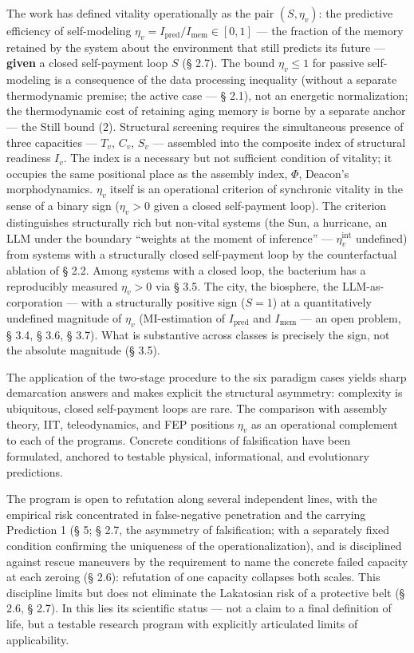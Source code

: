 \documentclass[pdflatex,sn-mathphys-ay]{sn-jnl}
\begin{document}
The work has defined vitality operationally as the pair \((S, \eta_v)\): the predictive efficiency of self-modeling \(\eta_v = I_{\text{pred}} / I_{\text{mem}} \in [0,1]\) --- the fraction of the memory retained by the system about the environment that still predicts its future --- \textbf{given} a closed self-payment loop \(S\) (§ 2.7). The bound \(\eta_v \le 1\) for passive self-modeling is a consequence of the data processing inequality (without a separate thermodynamic premise; the active case --- § 2.1), not an energetic normalization; the thermodynamic cost of retaining aging memory is borne by a separate anchor --- the Still bound (2). Structural screening requires the simultaneous presence of three capacities --- \(T_v\), \(C_v\), \(S_v\) --- assembled into the composite index of structural readiness \(I_v\). The index is a necessary but not sufficient condition of vitality; it occupies the same positional place as the assembly index, \(\Phi\), Deacon's morphodynamics. \(\eta_v\) itself is an operational criterion of synchronic vitality in the sense of a binary sign (\(\eta_v > 0\) given a closed self-payment loop). The criterion distinguishes structurally rich but non-vital systems (the Sun, a hurricane, an LLM under the boundary ``weights at the moment of inference'' --- \(\eta_v^{\text{int}}\) undefined) from systems with a structurally closed self-payment loop by the counterfactual ablation of § 2.2. Among systems with a closed loop, the bacterium has a reproducibly measured \(\eta_v > 0\) via § 3.5. The city, the biosphere, the LLM-as-corporation --- with a structurally positive sign (\(S = 1\)) at a quantitatively undefined magnitude of \(\eta_v\) (MI-estimation of \(I_{\text{pred}}\) and \(I_{\text{mem}}\) --- an open problem, § 3.4, § 3.6, § 3.7). What is substantive across classes is precisely the sign, not the absolute magnitude (§ 3.5).

The application of the two-stage procedure to the six paradigm cases yields sharp demarcation answers and makes explicit the structural asymmetry: complexity is ubiquitous, closed self-payment loops are rare. The comparison with assembly theory, IIT, teleodynamics, and FEP positions \(\eta_v\) as an operational complement to each of the programs. Concrete conditions of falsification have been formulated, anchored to testable physical, informational, and evolutionary predictions.

The program is open to refutation along several independent lines, with the empirical risk concentrated in false-negative penetration and the carrying Prediction 1 (§ 5; § 2.7, the asymmetry of falsification; with a separately fixed condition confirming the uniqueness of the operationalization), and is disciplined against rescue maneuvers by the requirement to name the concrete failed capacity at each zeroing (§ 2.6): refutation of one capacity collapses both scales. This discipline limits but does not eliminate the Lakatosian risk of a protective belt (§ 2.6, § 2.7). In this lies its scientific status --- not a claim to a final definition of life, but a testable research program with explicitly articulated limits of applicability.
\end{document}
